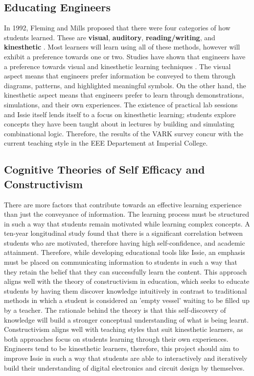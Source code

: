 \subsection{Educating Engineers} \label{subsec:educating_engineers}
In 1992, Fleming and Mills proposed that there were four categories of how students learned. These are \textbf{visual}, \textbf{auditory}, \textbf{reading/writing}, and \textbf{kinesthetic} \cite{Fleming1992}. Most learners will learn using all of these methods, however will exhibit a preference towards one or two. Studies have shown that engineers have a preference towards visual and kinesthetic learning techniques \cite{vark_engineers}. The visual aspect means that engineers prefer information be conveyed to them through diagrams, patterns, and highlighted meaningful symbols. On the other hand, the kinesthetic aspect means that engineers prefer to learn through demonstrations, simulations, and their own experiences. The existence of practical lab sessions and Issie itself lends itself to a focus on kinesthetic learning; students explore concepts they have been taught about in lectures by building and simulating combinational logic. Therefore, the results of the VARK survey concur with the current teaching style in the EEE Departement at Imperial College.

\subsection{Cognitive Theories of Self Efficacy and Constructivism} \label{subsec:self_efficacy}
There are more factors that contribute towards an effective learning experience than just the conveyance of information. The learning process must be structured in such a way that students remain motivated while learning complex concepts. A ten-year longitudinal study \cite{motivation} found that there is a significant correlation between students who are motivated, therefore having high self-confidence, and academic attainment. Therefore, while developing educational tools like Issie, an emphasis must be placed on communicating information to students in such a way that they retain the belief that they can successfully learn the content. This approach aligns well with the theory of constructivism in education, which seeks to educate students by having them discover knowledge intuitively in contrast to traditional methods in which a student is considered an 'empty vessel' waiting to be filled up by a teacher\cite{construct}. The rationale behind the theory is that this self-discovery of knowledge will build a stronger conceptual understanding of what is being learnt. Constructivism aligns well with teaching styles that suit kinesthetic learners, as both approaches focus on students learning through their own experiences. Engineers tend to be kinesthetic learners, therefore, this project should aim to improve Issie in such a way that students are able to interactively and iteratively build their understanding of digital electronics and circuit design by themselves.

